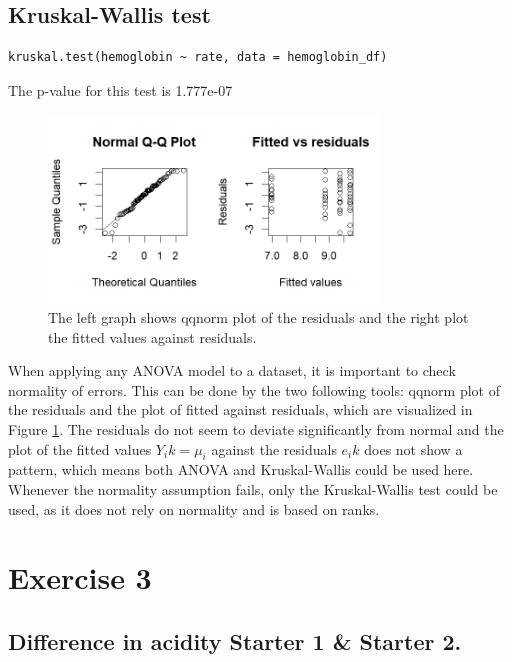 \documentclass{article}
\begin{document}
\subsection{Kruskal-Wallis test}
\begin{lstlisting}[caption="Kruskal-Wallis", label={lst:kw}]
    kruskal.test(hemoglobin ~ rate, data = hemoglobin_df)
\end{lstlisting}
The p-value for this test is 1.777e-07

\begin{figure}[h]
    \centering
    \includegraphics[height=5cm]{normal_fit_res_ex2.png}
    \caption{The left graph shows qqnorm plot of the residuals and the right plot the fitted values against residuals.}
    \label{fig:norfitresex2}
\end{figure}
When applying any ANOVA model to a dataset, it is important to check normality of errors. This can be done by the two following tools: qqnorm plot of the residuals and the plot of fitted against residuals, which are visualized in Figure \ref{fig:norfitresex2}.  
The residuals do not seem to deviate significantly from
normal and the plot of the fitted values $Y_ik = \mu_i$ against
the residuals $e_ik$ does not show a pattern, which means both ANOVA and Kruskal-Wallis could be used here. Whenever the normality assumption fails, only the Kruskal-Wallis test could be used, as it does not rely on normality and is based on ranks. 

\section{Exercise 3}

\subsection{Difference in acidity Starter 1 \& Starter 2.}
\end{document}
